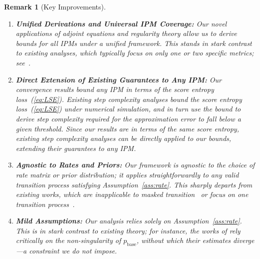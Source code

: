 \documentclass{article} %
\newtheorem{remark}[theorem]{Remark}
\def\eqref#1{equation~\ref{#1}}
\renewcommand{\eqref}[1]{\textup{(\ref{#1})}}
\begin{document}
\begin{remark}[Key Improvements]
\begin{enumerate}
    Our key techniques include: adjoint equations (see~\eqref{eq:KBE} and Appendix~\ref{subsec:proofIPM}), together with a regularity analysis (see Appendix~\ref{lemma:phi_bound}), that yield bounds for any IPM; a score–marginal cancellation technique and an exit-routing technique that achieve $S$-independence under masked transitions (see  and Appendix~\ref{sec:bound_scale}); and a coupling argument that achieves $S$-independence under uniform transitions (see~ and Appendix~\ref{sec:coupling_uniform}).
    \item \textbf{Unified Derivations and Universal IPM Coverage:} Our novel applications of adjoint equations and regularity theory allow us to derive bounds for all IPMs under a unified framework. This stands in stark contrast to existing analyses, which typically focus on only one or two specific metrics; see~.
    \item \label{rmk:extend_step_IPM} \textbf{Direct Extension of Existing Guarantees to Any IPM:} Our convergence results bound any IPM in terms of the score entropy loss~\eqref{eq:LSE}. Existing step complexity analyses bound the score entropy loss~\eqref{eq:LSE} under numerical simulation, and in turn use the bound to derive step complexity required for the approximation error to fall below a given threshold. Since our results are in terms of the same score entropy, existing step complexity analyses can be directly applied to our bounds, extending their guarantees to any IPM.
    \item \textbf{Agnostic to Rates and Priors:} Our framework is agnostic to the choice of rate matrix or prior distribution; it applies straightforwardly to any valid transition process satisfying Assumption~\ref{ass:rate}. This sharply departs from existing works, which are inapplicable to masked transition~\citep{zhang2025convergence,liang2026absorb,ren2025discrete,liang2026discrete,dmitriev2026efficient} or focus on one transition process~\citep{liang2026sharp}.
    \item \textbf{Mild Assumptions:} Our analysis relies solely on Assumption~\ref{ass:rate}. This is in stark contrast to existing theory; for instance, the works of \cite{zhang2025convergence,liang2026absorb,ren2025discrete,liang2026discrete,dmitriev2026efficient} rely critically on the non-singularity of $p_{\mathrm{base}}$, without which their estimates diverge---a constraint we do not impose.
\end{enumerate}
\end{remark}
\end{document}
